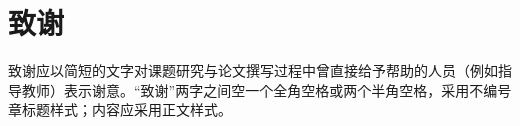 \chapter*{致\quad 谢}

致谢应以简短的文字对课题研究与论文撰写过程中曾直接给予帮助的人员（例如指导教师）表示谢意。“致谢”两字之间空一个全角空格或两个半角空格，采用不编号章标题样式；内容应采用正文样式。
